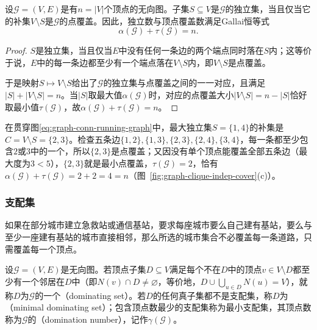 \begin{theorem}[独立集与点覆盖的补集对偶与Gallai恒等式]
\label{thm:graph-gallai-identity}
设$\mathcal G=(V,E)$是有$n=|V|$个顶点的无向图。子集$S\subseteq V$是$\mathcal G$的独立集，当且仅当它的补集$V\setminus S$是$\mathcal G$的点覆盖。因此，独立数与顶点覆盖数满足Gallai恒等式
\begin{equation}
\alpha(\mathcal G)+\tau(\mathcal G)=n.
\label{eq:graph-gallai-identity}
\end{equation}
\end{theorem}

\begin{proof}
$S$是独立集，当且仅当$E$中没有任何一条边的两个端点同时落在$S$内；这等价于说，$E$中的每一条边都至少有一个端点落在$V\setminus S$内，即$V\setminus S$是点覆盖。

于是映射$S\mapsto V\setminus S$给出了$\mathcal G$的独立集与点覆盖之间的一一对应，且满足$|S|+|V\setminus S|=n$。当$|S|$取最大值$\alpha(\mathcal G)$时，对应的点覆盖大小$|V\setminus S|=n-|S|$恰好取最小值$\tau(\mathcal G)$，故$\alpha(\mathcal G)+\tau(\mathcal G)=n$。
\end{proof}

在贯穿图\eqref{eq:graph-conn-running-graph}中，最大独立集$S=\{1,4\}$的补集是$C=V\setminus S=\{2,3\}$。检查五条边$\{1,2\},\{1,3\},\{2,3\},\{2,4\},\{3,4\}$，每一条都至少包含$2$或$3$中的一个，所以$\{2,3\}$是点覆盖；又因没有单个顶点能覆盖全部五条边（最大度为$3<5$），$\{2,3\}$就是最小点覆盖，$\tau(\mathcal G)=2$，恰有$\alpha(\mathcal G)+\tau(\mathcal G)=2+2=4=n$（图~\ref{fig:graph-clique-indep-cover}(c)）。

\subsubsection{支配集}
\label{sec:graph-dominating-set}

如果在部分城市建立急救站或通信基站，要求每座城市要么自己建有基站，要么与至少一座建有基站的城市直接相邻，那么所选的城市集合不必覆盖每一条道路，只需覆盖每一个顶点。

\begin{definition}[支配集与支配数]
\label{def:graph-dominating-set}
设$\mathcal G=(V,E)$是无向图。若顶点子集$D\subseteq V$满足每个不在$D$中的顶点$v\in V\setminus D$都至少有一个邻居在$D$中（即$N(v)\cap D\neq\varnothing$，等价地，$D\cup\bigcup_{u\in D}N(u)=V$），就称$D$为$\mathcal G$的一个（dominating set）。若$D$的任何真子集都不是支配集，称$D$为（minimal dominating set）；包含顶点数最少的支配集称为最小支配集，其顶点数称为$\mathcal G$的（domination number），记作$\gamma(\mathcal G)$。
\end{definition}

